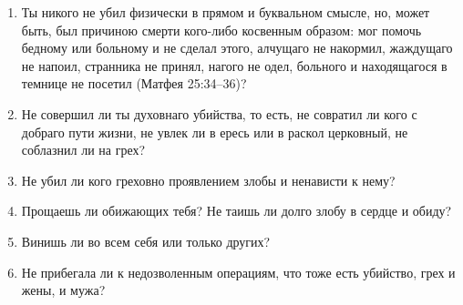 \nopagebreak

\begin{mymulticols}

\begin{enumerate}

\item Ты никого не убил физически в прямом и буквальном смысле, но, может быть, был причиною смерти кого-либо косвенным образом: мог помочь бедному или больному и не сделал этого, алчущаго не накормил, жаждущаго не напоил, странника не принял, нагого не одел, больного и находящагося в темнице не посетил (Матфея 25:34--36)?

\item Не совершил ли ты духовнаго убийства, то есть, не совратил ли кого с добраго пути жизни, не увлек ли в ересь или в раскол церковный, не соблазнил ли на грех?

\item Не убил ли кого греховно проявлением злобы и ненависти к нему?

\item Прощаешь ли обижающих тебя? Не таишь ли долго злобу в сердце и обиду?

\item Винишь ли во всем себя или только других?

\item Не прибегала ли к недозволенным операциям, что тоже есть убийство, грех и жены, и мужа? 
\end{enumerate}

\end{mymulticols}

\nopagebreak

